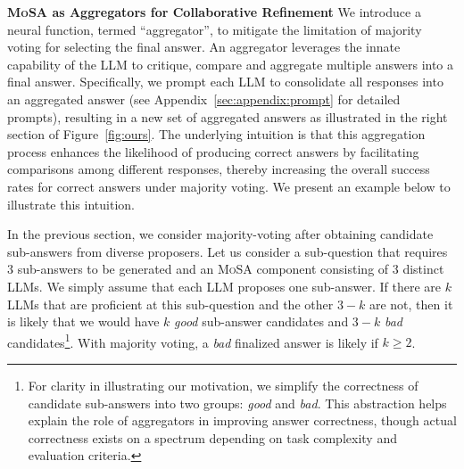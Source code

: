 








\textbf{\textsc{MoSA} as Aggregators for Collaborative Refinement}
\hspace{5pt}
We introduce a neural function, termed ``aggregator'', to mitigate the limitation of majority voting for selecting the final answer. 
An aggregator leverages the innate capability of the LLM to critique, compare and aggregate multiple answers into a final answer. 
Specifically, we prompt each LLM to consolidate all responses into an aggregated answer (see Appendix~\ref{sec:appendix:prompt} for detailed prompts), resulting in a new set of aggregated answers as illustrated in the right section of Figure~\ref{fig:ours}.
The underlying intuition is that this aggregation process enhances the likelihood of producing correct answers by facilitating comparisons among different responses, thereby increasing the overall success rates for correct answers under majority voting.
We present an example below to illustrate this intuition.

In the previous section, we consider majority-voting after obtaining candidate sub-answers from diverse proposers.
Let us consider a sub-question that requires 3 sub-answers to be generated and an \textsc{MoSA} component consisting of 3 distinct LLMs.
We simply assume that each LLM proposes one sub-answer.
If there are $k$ LLMs that are proficient at this sub-question and the other $3-k$ are not, then it is likely that we would have $k$ \emph{good} sub-answer candidates and $3-k$ \emph{bad} candidates\footnote{For clarity in illustrating our motivation, we simplify the correctness of candidate sub-answers into two groups: \emph{good} and \emph{bad}. This abstraction helps explain the role of aggregators in improving answer correctness, though actual correctness exists on a spectrum depending on task complexity and evaluation criteria.}.
With majority voting, a \emph{bad} finalized answer is likely if $k\geq2$.

